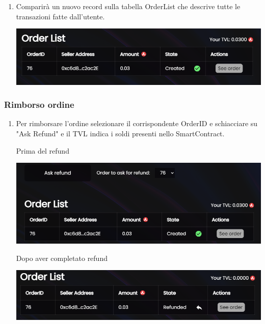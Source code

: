 \begin{enumerate}
    \item Comparirà un nuovo record sulla tabella OrderList che descrive tutte le transazioni fatte dall'utente.
    
    \begin{center}
    \includegraphics[scale = 0.35]{img/OrderList.PNG}\\
    \end{center}
    
\end{enumerate}

\subsubsection{Rimborso ordine}
\begin{enumerate}
    \item Per rimborsare l'ordine selezionare il corrispondente OrderID e schiacciare su "Ask Refund" e il TVL indica i soldi presenti nello SmartContract.
    
    Prima del refund\\
    \begin{center}
        \includegraphics[scale = 0.35]{img/PrimaRefund.PNG}
    \end{center}  
    Dopo aver completato refund\\
    \begin{center}
        \includegraphics[scale = 0.35]{img/DopoRefund.PNG}
    \end{center}
\end{enumerate}

